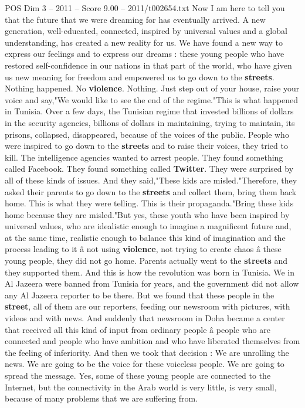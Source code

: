 \begin{textsample}{POS Dim 3 – 2011 – Score 9.00 – 2011/t002654.txt}
Now I am here to tell you that the future that we were dreaming for has eventually arrived.
A new generation, well-educated, connected, inspired by universal values and a global understanding, has created a new reality for us.
We have found a new way to express our feelings and to express our dreams : these young people who have restored self-confidence in our nations in that part of the world, who have given us new meaning for freedom and empowered us to go down to the \textbf{streets}.
Nothing happened.
No \textbf{violence}.
Nothing.
Just step out of your house, raise your voice and say,"We would like to see the end of the regime."This is what happened in Tunisia.
Over a few days, the Tunisian regime that invested billions of dollars in the security agencies, billions of dollars in maintaining, trying to maintain, its prisons, collapsed, disappeared, because of the voices of the public.
People who were inspired to go down to the \textbf{streets} and to raise their voices, they tried to kill.
The intelligence agencies wanted to arrest people.
They found something called Facebook.
They found something called \textbf{Twitter}.
They were surprised by all of these kinds of issues.
And they said,"These kids are misled."Therefore, they asked their parents to go down to the \textbf{streets} and collect them, bring them back home.
This is what they were telling.
This is their propaganda."Bring these kids home because they are misled."But yes, these youth who have been inspired by universal values, who are idealistic enough to imagine a magnificent future and, at the same time, realistic enough to balance this kind of imagination and the process leading to it â not using \textbf{violence}, not trying to create chaos â these young people, they did not go home.
Parents actually went to the \textbf{streets} and they supported them.
And this is how the revolution was born in Tunisia.
We in Al Jazeera were banned from Tunisia for years, and the government did not allow any Al Jazeera reporter to be there.
But we found that these people in the \textbf{street}, all of them are our reporters, feeding our newsroom with pictures, with videos and with news.
And suddenly that newsroom in Doha became a center that received all this kind of input from ordinary people â people who are connected and people who have ambition and who have liberated themselves from the feeling of inferiority.
And then we took that decision : We are unrolling the news.
We are going to be the voice for these voiceless people.
We are going to spread the message.
Yes, some of these young people are connected to the Internet, but the connectivity in the Arab world is very little, is very small, because of many problems that we are suffering from.

\end{textsample}
